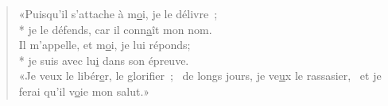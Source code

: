 \begin{verse}
«Puisqu’il s’attache à m\underline{o}i, je le délivre ; \\*
je le défends, car il conn\underline{a}ît mon nom. \\
Il m’appelle, et m\underline{o}i, je lui réponds; \\*
je suis avec lu\underline{i} dans son épreuve. \\

«Je veux le libér\underline{e}r, le glorifier ;~\psalmdagger
{}de longs jours, je ve\underline{u}x le rassasier,~\psalmstar
et je ferai qu’il v\underline{o}ie mon salut.» \\
\end{verse}


